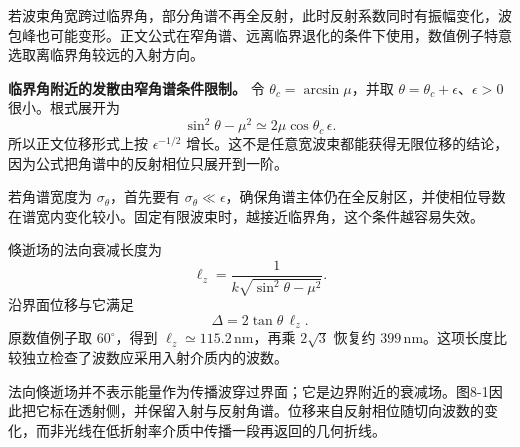 \documentclass[12pt,a4paper,UTF8]{ctexart}
\begin{document}
若波束角宽跨过临界角，部分角谱不再全反射，此时反射系数同时有振幅变化，波包峰也可能变形。正文公式在窄角谱、远离临界退化的条件下使用，数值例子特意选取离临界角较远的入射方向。

\textbf{临界角附近的发散由窄角谱条件限制。} 令
\(\theta_c=\arcsin\mu\)，并取
\(\theta=\theta_c+\epsilon\)、\(\epsilon>0\) 很小。根式展开为 \[
\sin^2\theta-\mu^2\simeq2\mu\cos\theta_c\,\epsilon.
\] 所以正文位移形式上按 \(\epsilon^{-1/2}\)
增长。这不是任意宽波束都能获得无限位移的结论，因为公式把角谱中的反射相位只展开到一阶。

若角谱宽度为 \(\sigma_\theta\)，首先要有
\(\sigma_\theta\ll\epsilon\)，确保角谱主体仍在全反射区，并使相位导数在谱宽内变化较小。固定有限波束时，越接近临界角，这个条件越容易失效。

倏逝场的法向衰减长度为 \[
\ell_z=\frac1{k\sqrt{\sin^2\theta-\mu^2}}.
\] 沿界面位移与它满足 \[
\Delta=2\tan\theta\,\ell_z.
\] 原数值例子取 \(60^\circ\)，得到
\(\ell_z\simeq115.2\,\mathrm{nm}\)，再乘 \(2\sqrt3\) 恢复约
\(399\,\mathrm{nm}\)。这项长度比较独立检查了波数应采用入射介质内的波数。

法向倏逝场并不表示能量作为传播波穿过界面；它是边界附近的衰减场。图8-1因此把它标在透射侧，并保留入射与反射角谱。位移来自反射相位随切向波数的变化，而非光线在低折射率介质中传播一段再返回的几何折线。
\end{document}
